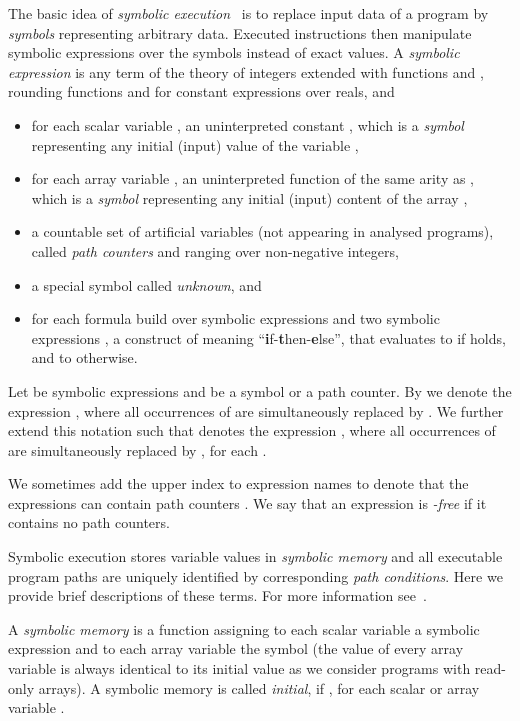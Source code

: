\documentclass[10pt,a4paper]{article}
\begin{document}
The basic idea of \emph{symbolic execution}~\cite{Kin76} is to replace
input data of a program by \emph{symbols} representing arbitrary
data. Executed instructions then manipulate symbolic expressions over
the symbols instead of exact values. A \emph{symbolic expression} is
any term of the theory of integers extended with functions
 and , rounding functions  and
 for constant expressions over reals, and
\begin{itemize}
\item for each scalar variable , an uninterpreted constant
  , which is a \emph{symbol} representing any initial
  (input) value of the variable ,
\item for each array variable , an uninterpreted function 
  of the same arity as , which is a \emph{symbol} representing any
  initial (input) content of the array ,
\item a countable set  of artificial variables (not appearing in analysed programs), called
  \emph{path counters} and ranging over non-negative integers,
\item a special symbol  called \emph{unknown}, and
\item for each formula  build over symbolic expressions and two
  symbolic expressions , a construct 
  of meaning ``\textbf{i}f-\textbf{t}hen-\textbf{e}lse'', that evaluates to
   if  holds, and to  otherwise.
\end{itemize}

Let  be symbolic expressions and  be a symbol or a path
counter. By  we denote the expression , where all
occurrences of  are simultaneously replaced by . We further extend
this notation such that  denotes the
expression , where all occurrences of  are simultaneously
replaced by , for each . 

We sometimes add the upper index  to expression names to
denote that the expressions can contain path counters . We say that an expression is
\emph{-free} if it contains no path counters.

Symbolic execution stores variable values in \emph{symbolic memory} and all
executable program paths are uniquely identified by corresponding \emph{path
  conditions}. Here we provide brief descriptions of these
terms. For more information see~\cite{Kin76}.

A \emph{symbolic memory} is a function  assigning to each scalar
variable  a symbolic expression and to each array variable
 the symbol  (the value of every array variable is always
identical to its initial value as we consider programs with read-only
arrays). A symbolic memory  is called \emph{initial}, if
, for each scalar or array variable .
\end{document}
